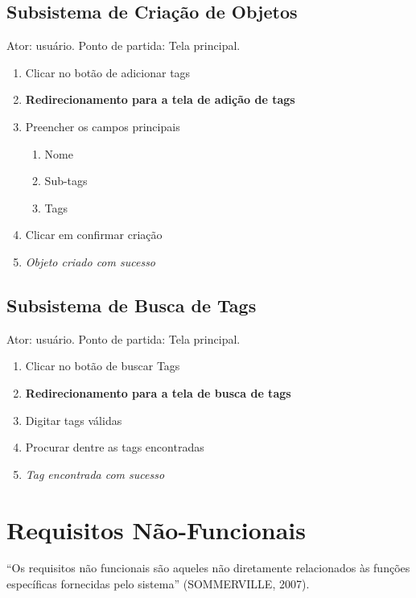         \subsection{Subsistema de Criação de Objetos}
            Ator: usuário.
            Ponto de partida: Tela principal.
            \begin{enumerate}
                \item Clicar no botão de adicionar tags
                \item \textbf{Redirecionamento para a tela de adição de tags}
                \item Preencher os campos principais
                \begin{enumerate}
                    \item Nome
                    \item Sub-tags
                    \item Tags
                \end{enumerate}
                \item Clicar em confirmar criação
                \item \textit{Objeto criado com sucesso}
            \end{enumerate}
        \subsection{Subsistema de Busca de Tags}
            Ator: usuário.
            Ponto de partida: Tela principal.
            \begin{enumerate}
                \item Clicar no botão de buscar Tags
                \item \textbf{Redirecionamento para a tela de busca de tags}
                \item Digitar tags válidas
                \item Procurar dentre as tags encontradas
                \item \textit{Tag encontrada com sucesso}
            \end{enumerate}

    \section{Requisitos Não-Funcionais} %
        “Os requisitos não funcionais são aqueles não diretamente relacionados às funções específicas fornecidas pelo sistema” (SOMMERVILLE, 2007).
        
